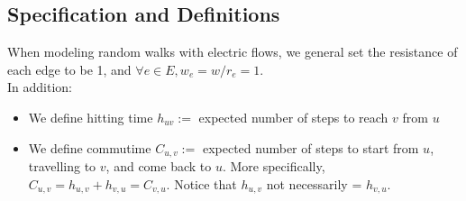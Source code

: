\documentclass[12pt]{article}
\begin{document}
\subsection{Specification and Definitions}
When modeling random walks with electric flows, we general set the resistance of each edge to be 1, and $\forall e \in E, w_e = w/r_e = 1$. \\
\newline
In addition:
\begin{itemize}
	\item We define hitting time $h_{uv} := $ expected number of steps to reach $v$ from $u$
	\item We define commutime $C_{u, v} := $ expected number of steps to start from $u$, travelling to $v$, and come back to $u$. More specifically, $C_{u, v} = h_{u, v} + h_{v, u} = C_{v, u}$. Notice that $h_{u, v}$ not necessarily = $ h_{v, u}$.
\end{itemize}
\end{document}
